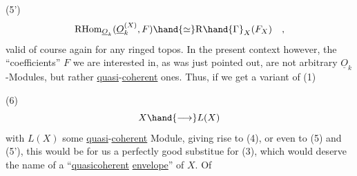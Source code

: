 (5') \[ \mathrm{RHom}_{\underline{O}_k}( \underline{O}_k^{(X)}, F ) \hand{\simeq} \mathrm{R}\hand{\Gamma}_X(F_X) \quad , \]
valid of course again for any ringed topos. In the present context
however, the ``coefficients'' $F$ we are interested in, as was just pointed
out, are not arbitrary $\underline{O}_k$-Modules, but rather \uline{quasi}-\uline{coherent} ones.
Thus, if we get a variant of (1)

(6) \[ X \hand{\longrightarrow} L(X) \]
with $L(X)$ some \uline{quasi}-\uline{coherent} Module, giving rise to (4), or even to
(5) and (5'), this would be for us a perfectly good substitue for (3),
which would deserve the name of a ``\uline{quasicoherent} \uline{envelope}'' of $X$. Of


